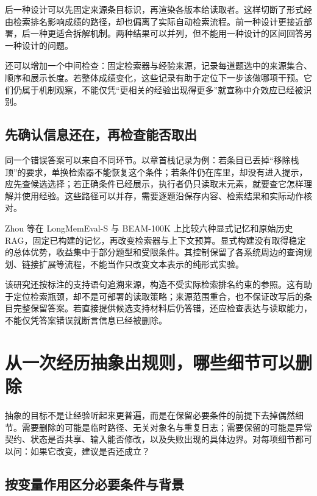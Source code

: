 后一种设计可以先固定来源条目标识，再渲染各版本给读取者。这样切断了形式经由检索排名影响成绩的路径，却也偏离了实际自动检索流程。前一种设计更接近部署，后一种更适合拆解机制。两种结果可以并列，但不能用一种设计的区间回答另一种设计的问题。

还可以增加一个中间检查：固定检索器与经验来源，记录每道题选中的来源集合、顺序和展示长度。若整体成绩变化，这些记录有助于定位下一步该做哪项干预。它们仍属于机制观察，不能仅凭“更相关的经验出现得更多”就宣称中介效应已经被识别。

\subsection{先确认信息还在，再检查能否取出}
\label{sec:ch05-construction-retrieval}

同一个错误答案可以来自不同环节。以章首栈记录为例：若条目已丢掉“移除栈顶”的要求，单换检索器不能恢复这个条件；若条件仍在库里，却没有进入提示，应先查候选选择；若正确条件已经展示，执行者仍只读取末元素，就要查它怎样理解并使用经验。这些路径可以并存，需要逐题沿保存内容、检索结果和实际动作核对。

Zhou 等在 LongMemEval-S 与 BEAM-100K 上比较六种显式记忆和原始历史 RAG，固定已构建的记忆，再改变检索器与上下文预算。显式构建没有取得稳定的总体优势，收益集中于部分题型和受限条件\cite{raw-history-memory-2610}。其控制保留了各系统周边的查询规划、链接扩展等流程，不能当作只改变文本表示的纯形式实验。

该研究还按标注的支持语句追溯来源，构造不受实际检索排名约束的参照\cite{raw-history-memory-2610}。这有助于定位检索瓶颈，却不是可部署的读取策略；来源范围重合，也不保证改写后的条目完整保留答案。若直接提供候选支持材料后仍答错，还应检查表达与读取能力，不能仅凭答案错误就断言信息已经被删除。

\section{从一次经历抽象出规则，哪些细节可以删除}
\label{sec:ch05-abstraction}

抽象的目标不是让经验听起来更普遍，而是在保留必要条件的前提下去掉偶然细节。需要删除的可能是临时路径、无关对象名与重复日志；需要保留的可能是异常契约、状态是否共享、输入能否修改，以及失败出现的具体边界。对每项细节都可以问：如果它改变，建议是否还成立？

\subsection{按变量作用区分必要条件与背景}

